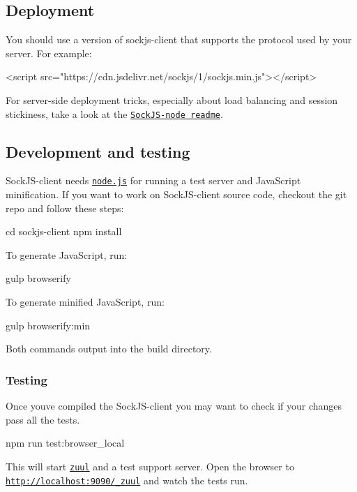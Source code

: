 \subsection*{Deployment }

You should use a version of sockjs-\/client that supports the protocol used by your server. For example\+:


\begin{DoxyCode}
<script src="https://cdn.jsdelivr.net/sockjs/1/sockjs.min.js"></script>
\end{DoxyCode}


For server-\/side deployment tricks, especially about load balancing and session stickiness, take a look at the \href{https://github.com/sockjs/sockjs-node#readme}{\tt Sock\+J\+S-\/node readme}.

\subsection*{Development and testing }

Sock\+J\+S-\/client needs \href{https://nodejs.org/}{\tt node.\+js} for running a test server and Java\+Script minification. If you want to work on Sock\+J\+S-\/client source code, checkout the git repo and follow these steps\+: \begin{DoxyVerb}cd sockjs-client
npm install
\end{DoxyVerb}


To generate Java\+Script, run\+: \begin{DoxyVerb}gulp browserify
\end{DoxyVerb}


To generate minified Java\+Script, run\+: \begin{DoxyVerb}gulp browserify:min
\end{DoxyVerb}


Both commands output into the {\ttfamily build} directory.

\subsubsection*{Testing}

Once you\textquotesingle{}ve compiled the Sock\+J\+S-\/client you may want to check if your changes pass all the tests. \begin{DoxyVerb}npm run test:browser_local
\end{DoxyVerb}


This will start \href{https://github.com/defunctzombie/zuul}{\tt zuul} and a test support server. Open the browser to \href{http://localhost:9090/_zuul}{\tt http\+://localhost\+:9090/\+\_\+zuul} and watch the tests run.

